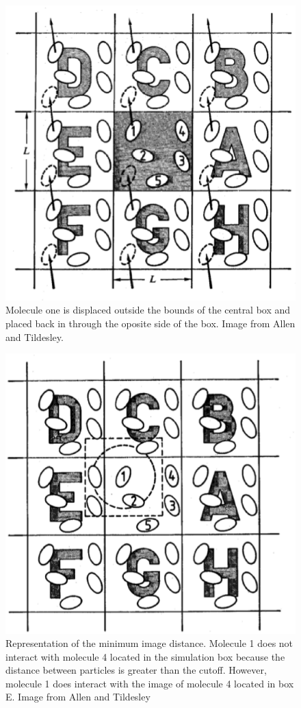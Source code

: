 \documentclass[aip,jcp,preprint,superscriptaddress,floatfix]{revtex4-1}
\begin{document}
\begin{figure}[t]
	\includegraphics[scale = 0.5]{pbc.eps}
	\caption{Molecule one is displaced outside the bounds of the central box and placed back
	in through the oposite side of the box. Image from Allen and Tildesley. ~\cite{Allen.Book}}
	\centering
	\label{fig:pbc}
\end{figure}

\begin{figure}[t]
	\includegraphics[scale = 0.5]{minimumImage.eps}
	\caption{Representation of the minimum image distance. Molecule 1 does not interact with 
		molecule 4 located in the simulation box because the distance between particles is 
		greater than the cutoff. However, molecule 1 does interact with
		the image of molecule 4 located in box E. Image from Allen and 
		Tildesley ~\cite{Allen.Book}}
	\centering
	\label{fig:minimumImage}
\end{figure}
\end{document}
